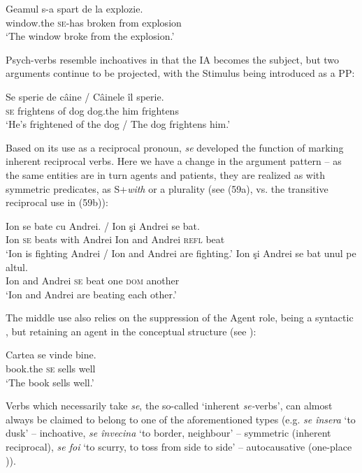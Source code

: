 \documentclass[output=paper]{langsci/langscibook}
\begin{document}
\ea%
    \label{ex:giurgea:57}
    \gll Geamul        s-a      spart    {de la}  explozie.\\
         window.the \textsc{se-}has broken from explosion\\
    \glt ‘The window broke from the explosion.’
    \z

Psych-verbs resemble inchoatives in that the IA becomes the subject, but two arguments continue to be projected, with the Stimulus being introduced as a PP:

\ea%
    \label{ex:giurgea:58}
    \gll Se sperie     de câine / Câinele îl    sperie.\\
         \textsc{se} frightens of dog {}     dog.the him frightens\\
    \glt ‘He’s frightened of the dog / The dog frightens him.’
    \z



Based on its use as a reciprocal pronoun, \textit{se} developed the function of marking inherent reciprocal verbs. Here we have a change in the argument pattern – as the same entities are in turn agents and patients, they are realized as with symmetric predicates, as S+\textit{with} or a plurality (see (59a), vs. the transitive reciprocal use in (59b)):

\ea%
    \label{ex:giurgea:59}
    \ea
    \gll Ion se  bate   cu   Andrei.   /   Ion şi     Andrei se     bat.\\
          Ion \textsc{se} beats with Andrei   {}     Ion and Andrei \textsc{refl} beat\\
    \glt ‘Ion is fighting Andrei / Ion and Andrei are fighting.’
    \ex
    \gll Ion şi     Andrei se bat   unul pe     altul.\\
          Ion and Andrei  \textsc{se} beat one  \textsc{dom} another\\
    \glt ‘Ion and Andrei are beating each other.’
    \z
\z

The middle use also relies on the suppression of the Agent role, being a syntactic , but retaining an agent in the conceptual structure (see \citealt{Schäfer2008}):

\ea%
    \label{ex:giurgea:60}
    \gll Cartea    se vinde bine. \\
         book.the \textsc{se} sells  well\\
    \glt ‘The book sells well.’
    \z

Verbs which necessarily take \textit{se}, the so-called ‘inherent \textit{se-}verbs', can almost always be claimed to belong to one of the aforementioned types (e.g. \textit{se însera} ‘to dusk’ – inchoative, \textit{se învecina} ‘to border, neighbour’ – symmetric (inherent reciprocal), \textit{se foi} ‘to scurry, to toss from side to side’ – autocausative (one-place )).
\end{document}
